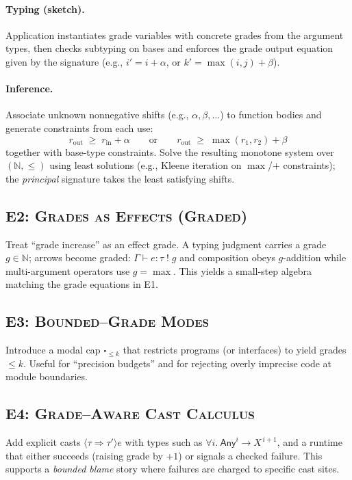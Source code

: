 \paragraph{Typing (sketch).}
Application instantiates grade variables with concrete grades from the argument types,
then checks subtyping on bases and enforces the grade output equation given by the signature
(e.g., $i'\!=\!i{+}\alpha$, or $k'\!=\!\max(i,j){+}\beta$).

\paragraph{Inference.}
Associate unknown nonnegative shifts (e.g., $\alpha,\beta,\dots$) to function bodies and generate constraints from each use:
\[
r_{\text{out}} \;\ge\; r_{\text{in}} + \alpha
\qquad\text{or}\qquad
r_{\text{out}} \;\ge\; \max(r_1,r_2) + \beta
\]
together with base-type constraints.
Solve the resulting monotone system over $(\mathbb{N},\le)$ using least solutions
(e.g., Kleene iteration on $\max$/$+$ constraints); the \emph{principal} signature takes the least satisfying shifts.

\medskip

\subsection{\textsc{E2: Grades as Effects (Graded)}}
Treat ``grade increase'' as an effect grade.
A typing judgment carries a grade $g\in\mathbb{N}$; arrows become graded:
\(
\Gamma \vdash e : \tau \;!\; g
\)
and composition obeys $g$-addition while multi-argument operators use $g=\max$.
This yields a small-step algebra matching the grade equations in \textsc{E1}.

\subsection{\textsc{E3: Bounded–Grade Modes}}
Introduce a modal cap $\square_{\le k}$ that restricts programs (or interfaces) to yield grades $\le k$.
Useful for ``precision budgets'' and for rejecting overly imprecise code at module boundaries.

\subsection{\textsc{E4: Grade–Aware Cast Calculus}}
Add explicit casts $\langle \tau \Rightarrow \tau'\rangle e$ with types such as
$\forall i.\ \textsf{Any}^{i} \to X^{\,i+1}$,
and a runtime that either succeeds (raising grade by $+1$) or signals a checked failure.
This supports a \emph{bounded blame} story where failures are charged to specific cast sites.

